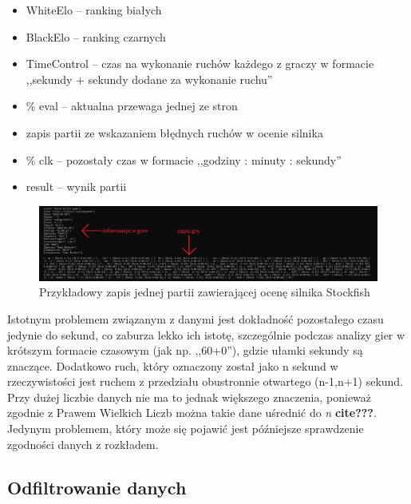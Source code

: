 \documentclass[inzynierska]{pwr_wmat_praca_dyplomowa}
\theoremstyle{plain}
\numberwithin{theorem}{chapter}
\theoremstyle{definition}
\numberwithin{theorem}{chapter}
\begin{document}
\begin{itemize}
	\item WhiteElo -- ranking białych
	\item BlackElo -- ranking czarnych
	\item TimeControl -- czas na wykonanie ruchów każdego z graczy w formacie  ,,sekundy + sekundy dodane za wykonanie ruchu''
	\item \% eval -- aktualna przewaga jednej ze stron
	\item zapis partii ze wskazaniem błędnych ruchów w ocenie silnika
	\item \% clk -- pozostały czas w formacie ,,godziny : minuty : sekundy''
	\item result -- wynik partii
\end{itemize}
\begin{figure}[H]
	\centering
	\includegraphics[width=\textwidth]{zapis_gry.png}
	\caption{Przykładowy zapis jednej partii zawierającej ocenę silnika Stockfish}
	\label{rys:zapis_gry} 
\end{figure}
Istotnym problemem związanym z danymi jest dokładność pozostałego czasu jedynie do sekund, co zaburza lekko ich istotę, szczególnie podczas analizy gier w krótszym formacie czasowym (jak np. ,,60+0''), gdzie ułamki sekundy są  znaczące. Dodatkowo ruch, który oznaczony został jako n sekund w rzeczywistości jest ruchem z przedziału obustronnie otwartego (n-1,n+1) sekund. Przy dużej liczbie danych nie ma to jednak większego znaczenia, ponieważ zgodnie z Prawem Wielkich Liczb można takie dane uśrednić do \textit{n} \textbf{cite???}. Jedynym problemem, który może się pojawić jest późniejsze sprawdzenie zgodności danych z rozkładem. 

\subsection{Odfiltrowanie danych}
\end{document}
